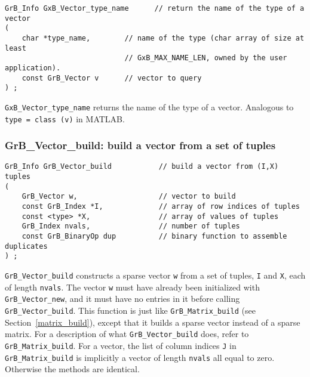 \documentclass[12pt]{article}
\begin{document}
\begin{mdframed}[userdefinedwidth=6in]
{\footnotesize
\begin{verbatim}
GrB_Info GxB_Vector_type_name      // return the name of the type of a vector
(
    char *type_name,        // name of the type (char array of size at least
                            // GxB_MAX_NAME_LEN, owned by the user application).
    const GrB_Vector v      // vector to query
) ;
\end{verbatim}
} \end{mdframed}

\verb'GxB_Vector_type_name' returns the name of the type of a vector.
Analogous to \verb'type = class (v)' in MATLAB.

\subsubsection{{\sf GrB\_Vector\_build:}         build a vector from a set of tuples}
\label{vector_build}

\begin{mdframed}[userdefinedwidth=6in]
{\footnotesize
\begin{verbatim}
GrB_Info GrB_Vector_build           // build a vector from (I,X) tuples
(
    GrB_Vector w,                   // vector to build
    const GrB_Index *I,             // array of row indices of tuples
    const <type> *X,                // array of values of tuples
    GrB_Index nvals,                // number of tuples
    const GrB_BinaryOp dup          // binary function to assemble duplicates
) ;
\end{verbatim}
} \end{mdframed}

\verb'GrB_Vector_build' constructs a sparse vector \verb'w' from a set of
tuples, \verb'I' and \verb'X', each of length \verb'nvals'.  The vector
\verb'w' must have already been initialized with \verb'GrB_Vector_new', and it
must have no entries in it before calling \verb'GrB_Vector_build'.
This function is just like \verb'GrB_Matrix_build' (see
Section~\ref{matrix_build}), except that it builds a sparse vector instead of a
sparse matrix.  For a description of what \verb'GrB_Vector_build' does, refer
to \verb'GrB_Matrix_build'.  For a vector, the list of column indices \verb'J'
in \verb'GrB_Matrix_build' is implicitly a vector of length \verb'nvals' all
equal to zero.  Otherwise the methods are identical.
\end{document}
